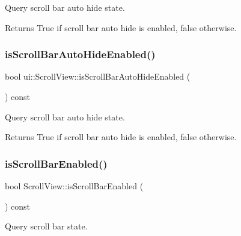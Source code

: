 Query scroll bar auto hide state. 

\begin{DoxyReturn}{Returns}
True if scroll bar auto hide is enabled, false otherwise. 
\end{DoxyReturn}
\mbox{\label{classui_1_1ScrollView_a1d9ea4d596c7992679abab9e89854c1b}} 
\subsubsection{\texorpdfstring{is\+Scroll\+Bar\+Auto\+Hide\+Enabled()}{isScrollBarAutoHideEnabled()}\hspace{0.1cm}{\footnotesize\ttfamily [2/2]}}
{\footnotesize\ttfamily bool ui\+::\+Scroll\+View\+::is\+Scroll\+Bar\+Auto\+Hide\+Enabled (\begin{DoxyParamCaption}{ }\end{DoxyParamCaption}) const}



Query scroll bar auto hide state. 

\begin{DoxyReturn}{Returns}
True if scroll bar auto hide is enabled, false otherwise. 
\end{DoxyReturn}
\mbox{\label{classui_1_1ScrollView_a8b5a35f6f822117b2bef77904a87566c}} 
\subsubsection{\texorpdfstring{is\+Scroll\+Bar\+Enabled()}{isScrollBarEnabled()}\hspace{0.1cm}{\footnotesize\ttfamily [1/2]}}
{\footnotesize\ttfamily bool Scroll\+View\+::is\+Scroll\+Bar\+Enabled (\begin{DoxyParamCaption}{ }\end{DoxyParamCaption}) const}



Query scroll bar state. 

